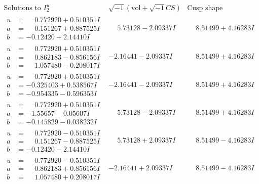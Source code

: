 \documentclass[1p]{elsarticle_modified}
\theoremstyle{definition}
\newcommand{\I}{\sqrt{-1}}
\begin{document}
$$\begin{array}{c|c|c}  
\text{Solutions to }I^u_{2}& \I (\text{vol} + \sqrt{-1}CS) & \text{Cusp shape}\\
 \hline 
\begin{aligned}
u &= \phantom{-}0.772920 + 0.510351 I \\
a &= \phantom{-}0.151267 + 0.887525 I \\
b &= -0.12420 + 2.14410 I\end{aligned}
 & \phantom{-}5.73128 - 2.09337 I & \phantom{-}8.51499 + 4.16283 I \\ \hline\begin{aligned}
u &= \phantom{-}0.772920 + 0.510351 I \\
a &= \phantom{-}0.862183 - 0.856156 I \\
b &= \phantom{-}1.057480 - 0.208017 I\end{aligned}
 & -2.16441 - 2.09337 I & \phantom{-}8.51499 + 4.16283 I \\ \hline\begin{aligned}
u &= \phantom{-}0.772920 + 0.510351 I \\
a &= -0.325403 + 0.538567 I \\
b &= -0.954335 - 0.596353 I\end{aligned}
 & -2.16441 - 2.09337 I & \phantom{-}8.51499 + 4.16283 I \\ \hline\begin{aligned}
u &= \phantom{-}0.772920 + 0.510351 I \\
a &= -1.55657 - 0.05607 I \\
b &= -0.145829 - 0.038232 I\end{aligned}
 & \phantom{-}5.73128 - 2.09337 I & \phantom{-}8.51499 + 4.16283 I \\ \hline\begin{aligned}
u &= \phantom{-}0.772920 - 0.510351 I \\
a &= \phantom{-}0.151267 - 0.887525 I \\
b &= -0.12420 - 2.14410 I\end{aligned}
 & \phantom{-}5.73128 + 2.09337 I & \phantom{-}8.51499 - 4.16283 I \\ \hline\begin{aligned}
u &= \phantom{-}0.772920 - 0.510351 I \\
a &= \phantom{-}0.862183 + 0.856156 I \\
b &= \phantom{-}1.057480 + 0.208017 I\end{aligned}
 & -2.16441 + 2.09337 I & \phantom{-}8.51499 - 4.16283 I \\ \hline\begin{aligned}

\end{aligned}
\end{array}$$
\end{document}
